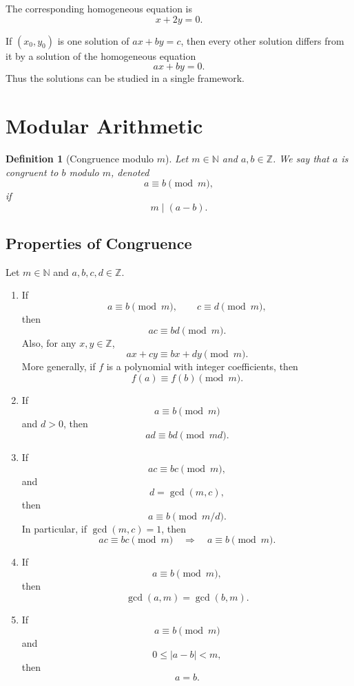 \documentclass[11pt]{article}
\newtheorem{definition}[theorem]{Definition}
\theoremstyle{remark}
\DeclareMathOperator{\gcdop}{gcd}
\newcommand{\Z}{\mathbb Z}
\newcommand{\N}{\mathbb N}
\begin{document}
The corresponding homogeneous equation is
\[
    x+2y=0.
\]

If $(x_0,y_0)$ is one solution of $ax+by=c$, then every other solution
differs from it by a solution of the homogeneous equation
\[
    ax+by=0.
\]
Thus the solutions can be studied in a single framework.

\section{Modular Arithmetic}

\begin{definition}[Congruence modulo $m$]
Let $m\in\N$ and $a,b\in\Z$. We say that $a$ is \emph{congruent to $b$
modulo $m$}, denoted
\[
    a\equiv b\pmod m,
\]
if
\[
    m\mid(a-b).
\]
\end{definition}

\subsection{Properties of Congruence}

Let $m\in\N$ and $a,b,c,d\in\Z$.

\begin{enumerate}[label=\arabic*.]
    \item If
    \[
        a\equiv b\pmod m,
        \qquad
        c\equiv d\pmod m,
    \]
    then
    \[
        ac\equiv bd\pmod m.
    \]
    Also, for any $x,y\in\Z$,
    \[
        ax+cy\equiv bx+dy\pmod m.
    \]
    More generally, if $f$ is a polynomial with integer coefficients,
    then
    \[
        f(a)\equiv f(b)\pmod m.
    \]

    \item If
    \[
        a\equiv b\pmod m
    \]
    and $d>0$, then
    \[
        ad\equiv bd\pmod{md}.
    \]

    \item If
    \[
        ac\equiv bc\pmod m,
    \]
    and
    \[
        d=\gcdop(m,c),
    \]
    then
    \[
        a\equiv b\pmod{m/d}.
    \]
    In particular, if $\gcdop(m,c)=1$, then
    \[
        ac\equiv bc\pmod m
        \quad\Longrightarrow\quad
        a\equiv b\pmod m.
    \]

    \item If
    \[
        a\equiv b\pmod m,
    \]
    then
    \[
        \gcdop(a,m)=\gcdop(b,m).
    \]

    \item If
    \[
        a\equiv b\pmod m
    \]
    and
    \[
        0\le |a-b|<m,
    \]
    then
    \[
        a=b.
    \]
\end{enumerate}
\end{document}

